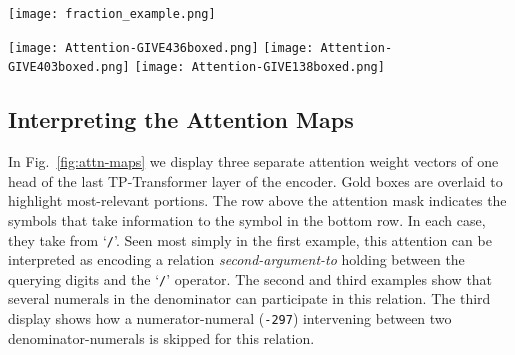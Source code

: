 \documentclass[11pt,a4paper]{article}
\begin{document}
\begin{figure*}[h!]
\centering
    \texttt{[image: fraction\_example.png]}
  \vspace{-8pt}
  \caption{Samples of correctly processed problems from the \textit{arithmetic\_\_mixed} module. 
  `\textsf{\#}' and `\textsf{\%}' are the start- and end-of-sentence symbols. The colored squares indicate the -means cluster of the role-vector assigned by one head in the final layer in that position.  Blue and gold rectangles respectively highlight numerator and denominator roles. They were discovered manually. Note how their placement is correctly swapped in rows 2, 3, and 4, where a number in the denominator of a denominator is treated as if in a numerator. Role-cluster 9 corresponds to the role \textit{ones-digit-of-a-numerator-factor}, and 6 to  \textit{ones-digit-of-a-denominator-factor}; other such roles are also evident.}
\label{fig:interpret}
\end{figure*}
\begin{figure*}[h!]
    \centering
    \texttt{[image: Attention-GIVE436boxed.png]}
    \texttt{[image: Attention-GIVE403boxed.png]}
    \texttt{[image: Attention-GIVE138boxed.png]}
    \vspace{-8pt}
    \caption{TP-Transformer attention maps for three examples as described in section \ref{sec:InterpAttn}.}
    \label{fig:attn-maps}
\end{figure*}

\subsection{Interpreting the Attention Maps}  \label{sec:InterpAttn}
In Fig.~\ref{fig:attn-maps} we display three separate attention weight vectors of one head of the last TP-Transformer layer of the encoder.
Gold boxes are overlaid to highlight most-relevant portions.
The row above the attention mask indicates the symbols that take information to the symbol in the bottom row.
In each case, they take from `\texttt{/}'.
Seen most simply in the first example, this attention can be interpreted as encoding a relation \textit{second-argument-to} holding between the querying digits and the `\texttt{/}' operator.
The second and third examples show that several numerals in the denominator can participate in this relation.
The third display shows how a numerator-numeral (\texttt{-297}) intervening between two denominator-numerals is skipped for this relation. 
\end{document}
